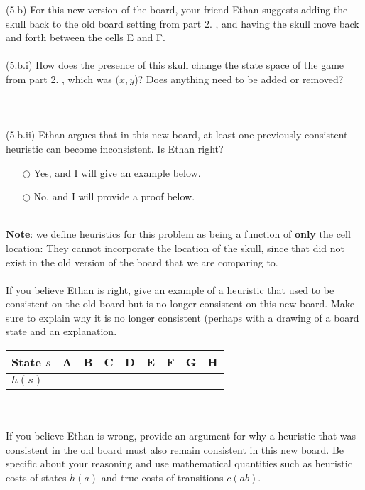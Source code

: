 \documentclass{article}
\begin{document}
\newpage
\noindent(5.b)  For this new version of the board, your friend Ethan suggests adding the skull back to the old board setting from part 2. , and having the skull move back and forth between the cells E and F.\\
~\\
(5.b.i) How does the presence of this skull change the state space of the game from part 2. , which was $(x, y$)? Does anything need to be added or removed?\\
~\\
~\\
~\\
(5.b.ii) Ethan argues that in this new board, at least one previously consistent heuristic can become inconsistent. Is Ethan right?
\begin{itemize}
\item[$\bigcirc$] Yes, and I will give an example below.
\item[$\bigcirc$] No, and I will provide a proof below. 
\end{itemize}
~\\
\textbf{Note}: we define heuristics for this problem as being a function of \textbf{only} the cell location: They cannot incorporate the location of the skull, since that did not exist in the old version of the board that we are comparing to.\\
~\\
If you believe Ethan is right, give an example of a heuristic that used to be consistent on the old board but is no longer consistent on this new board. Make sure to explain why it is no longer consistent (perhaps with a drawing of a board state and an explanation.
\renewcommand\arraystretch{1.5}
\begin{table}[tbh!]
\begin{center}
    \begin{tabular}{|p{2cm}| p{1cm}| p{1cm} | p{1cm}| p{1cm} | p{1cm}| p{1cm} | p{1cm}| p{1cm}|}
\hline
    State $s$  & A & B & C & D & E & F & G & H \\ \hline
    $h(s)$ &   &   &   &  &   &   &   &  \\
\hline
\end{tabular}
\end{center}
\end{table}
~\\
~\\
If you believe Ethan is wrong, provide an argument for why a heuristic that was consistent in the old board must also remain consistent in this new board. Be specific about your reasoning and use mathematical quantities such as heuristic costs of states $h(a)$ and true costs of transitions $c(ab)$.
\end{document}
